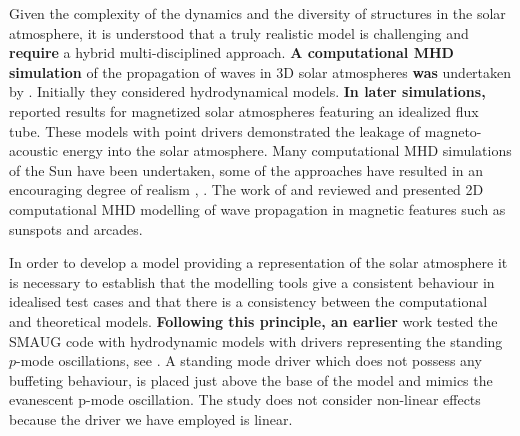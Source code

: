 \documentclass[physics,article,submit,pdftex,moreauthors]{Definitions/mdpi}
\begin{document}
Given the complexity of the dynamics and the diversity of structures in the solar atmosphere, it is understood that a truly realistic model is challenging and {\bf require} a hybrid multi-disciplined approach. {\bf A computational MHD simulation} of the propagation of waves in 3D solar atmospheres {\bf was} undertaken by \citet{Fedun2009a}. Initially they considered hydrodynamical models. {\bf In later simulations, }
\citet{Fedun2009b} \citet{Vigeesh2012} reported results for magnetized solar atmospheres featuring an idealized flux tube. These models with point drivers demonstrated the leakage of magneto-acoustic energy into the solar atmosphere. Many computational MHD simulations of the Sun have been undertaken, some of the approaches have resulted in an encouraging degree of realism  \citet{Vogler2005}, \citet{Gudiksen2011}.  The work of \citet{Khomenko2013} and  \citet{Santamaria2015} reviewed and presented 2D computational MHD modelling of wave propagation in magnetic features such as sunspots and arcades.

In order to develop a model providing a representation of the solar atmosphere it is necessary to establish that the modelling tools give a consistent behaviour in idealised test cases and that there is a consistency between the computational and theoretical models. {\bf Following this principle, an earlier} work tested the SMAUG code with hydrodynamic models with drivers representing the standing $p$-mode oscillations, see \citet{Griffiths2018b}. A standing mode driver which does not possess any buffeting behaviour, is placed just above the base of the model and mimics the evanescent p-mode oscillation. The study does not consider non-linear effects because the driver we have employed is linear.




 
\end{document}
